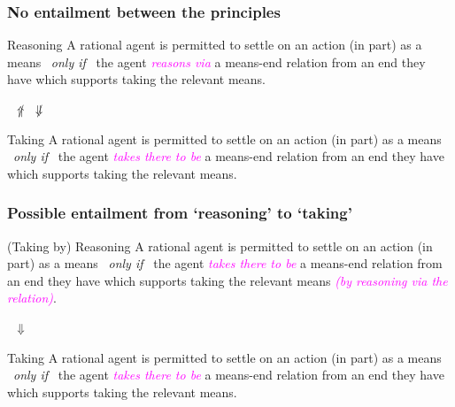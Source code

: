 \documentclass[noamssymb,
]{beamer} %
\begin{document}
\begin{frame}
  \frametitle{No entailment between the principles}

  \begin{block}{Reasoning}
    A rational agent is permitted to settle on an action (in part) as a means
    \newline
    \mbox{ }\hfill\emph{only if}\hfill\mbox{ }
    \newline
    the agent \textcolor{fuchsia}{\emph{reasons via}}  a means-end relation from an end they have which supports taking the relevant means.
  \end{block}

  {\Large \mbox{ }\hfill \(\not\Uparrow\) \qquad \(\not\Downarrow\) \hfill\mbox{ }}

  \begin{block}{Taking}
    A rational agent is permitted to settle on an action (in part) as a means
    \newline
    \mbox{ }\hfill\emph{only if}\hfill\mbox{ }
    \newline
    the agent \textcolor{fuchsia}{\emph{takes there to be}} a means-end relation from an end they have which supports taking the relevant means.
  \end{block}

\end{frame}


\begin{frame}
  \frametitle{Possible entailment from `reasoning' to `taking'}

  \begin{block}{(Taking by) Reasoning}
   A rational agent is permitted to settle on an action (in part) as a means
    \newline
    \mbox{ }\hfill\emph{only if}\hfill\mbox{ }
    \newline
    the agent \textcolor{fuchsia}{\emph{takes there to be}}  a means-end relation from an end they have which supports taking the relevant means \textcolor{fuchsia}{\emph{(by reasoning via the relation)}}.
  \end{block}

  {\Large \mbox{ }\hfill\(\Downarrow\)\hfill\mbox{ }}

  \begin{block}{Taking}
    A rational agent is permitted to settle on an action (in part) as a means
    \newline
    \mbox{ }\hfill\emph{only if}\hfill\mbox{ }
    \newline
    the agent \textcolor{fuchsia}{\emph{takes there to be}} a means-end relation from an end they have which supports taking the relevant means.
  \end{block}

\end{frame}
\end{document}
